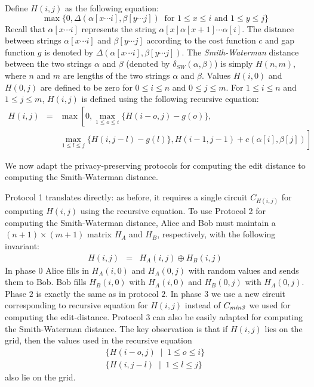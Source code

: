 Define $H(i,j)$ as the following equation:
\[
\max \{ 0 , \Delta (\alpha [ x \cdots i ], \beta [ y \cdots j ]) \; \;
\mbox{for $1 \leq x \leq i$ and $1 \leq y \leq j$} \}
\]
Recall that $\alpha [ x \cdots i ]$ represents the string $\alpha
[x] \alpha [x+1] \cdots \alpha [i]$. The distance between strings
$\alpha [ x \cdots i ]$ and $\beta [ y \cdots j ]$ according to the cost
function $c$ and gap function $g$ is denoted by $ \Delta (\alpha [ x
\cdots i ], \beta [ y \cdots j ])$. The {\it Smith-Waterman} distance
between the two strings $\alpha$ and $\beta$ (denoted by
$\delta_{SW}(\alpha,\beta)$) is simply $H(n,m)$, where $n$ and $m$ are
lengths of the two strings $\alpha$ and $\beta$. Values $H(i,0)$ and
$H(0,j)$ are defined to be zero for $0 \leq i \leq n$ and $0 \leq j
\leq m$. For $1 \leq i \leq n$ and $1 \leq j \leq m$, $H(i,j)$ is defined
using the following recursive equation:
\begin{eqnarray*}
H(i,j) & = & \max \left[ 0 , \max_{1 \leq o \leq i} \{ H(i-o,j) - g(o) \}, \right. \\
       &  & \left. \max_{1 \leq l \leq j} \{ H(i,j-l) - g(l) \} , H(i-1,j-1) + c(\alpha[i],\beta[j])   \right]
\end{eqnarray*}

We now adapt the privacy-preserving protocols for computing the edit
distance to computing the Smith-Waterman distance.

Protocol 1 translates directly: as before, it requires a single circuit
$C_{H(i,j)}$ for computing $H(i,j)$ using the recursive equation.
To use Protocol 2 for computing the Smith-Waterman distance,
Alice and Bob must maintain a $(n+1) \times (m+1)$ matrix
$H_A$ and $H_B$, respectively, with the following invariant:
\begin{eqnarray*}
H (i,j) & = & H_A (i,j) \oplus H_B (i,j)
\end{eqnarray*}
In phase $0$ Alice fills in $H_A (i,0)$ and $H_A (0,j)$ with random
values and sends them to Bob. Bob fills $H_B (i,0)$ with $H_A(i,0)$
and $H_B (0,j)$ with $H_A (0,j)$. Phase $2$ is exactly the same as in
protocol $2$.  In phase $3$ we use a new circuit corresponding to
recursive equation for $H(i,j)$ instead of $C_{\mathit{min3}}$ we used for computing
the edit-distance.  Protocol $3$ can also be easily adapted for
computing the Smith-Waterman distance. The key observation is that if
$H(i,j)$ lies on the grid, then the values used in the recursive
equation
\[
\begin{array}{l}
\{ H(i-o,j) \; \mid \; 1 \leq o \leq i \} \\
\{ H(i,j-l)  \; \mid \; 1 \leq l \leq j \}
\end{array}
\]
also lie on the grid. 


